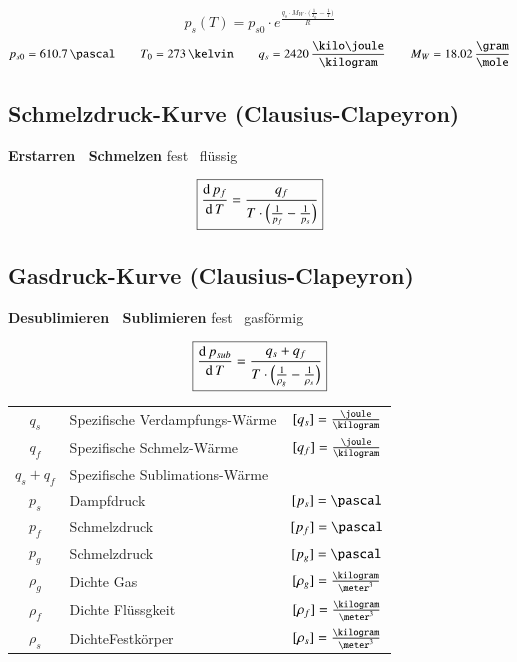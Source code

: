 \vspace{-0.2cm}

$$ \boxed{ p_s(T) = p_{s0} \cdot e^{\frac{q_s \cdot M_W \cdot \Big( \frac{1}{T_0} - \frac{1}{T} \Big)}{R}}} $$
$$ p_{s0} = 610.7 \, \pascal \qquad T_0 = 273 \, \kelvin \qquad q_s = 2420 \, \frac{\kilo \joule}{\kilogram} \qquad M_W = 18.02 \, \frac{\gram}{\mole} $$



\subsection{Schmelzdruck-Kurve (Clausius-Clapeyron)}

\textbf{Erstarren \textlrarrow\ Schmelzen}  \qquad fest \textlrarrow\ flüssig

$$ \boxed{ \frac{\mathop{} \! \mathrm{d} \, p_f}{\mathop{} \! \mathrm{d} \, T} = \frac{q_f}{T \cdot \Big( \frac{1}{p_f} - \frac{1}{p_s} \Big) } } $$


\subsection{Gasdruck-Kurve (Clausius-Clapeyron)}

\textbf{Desublimieren \textlrarrow\ Sublimieren} \qquad fest \textleftarrow\ gasförmig

$$ \boxed{ \frac{\mathop{} \! \mathrm{d} \, p_{sub}}{\mathop{} \! \mathrm{d} \, T} = \frac{q_s + q_f}{T \cdot \Big( \frac{1}{\rho_g} - \frac{1}{\rho_s} \Big) } } $$


\renewcommand{\arraystretch}{1.3}
\begin{tabular}{c l c}	
	$q_s$ 		& Spezifische Verdampfungs-Wärme 	& $[q_s] = \frac{\joule}{\kilogram}$		\\
	$q_f$ 		& Spezifische Schmelz-Wärme 		& $[q_f] = \frac{\joule}{\kilogram}$ 		\\
	$q_s + q_f$ & Spezifische Sublimations-Wärme 	&	 										\\
	$p_s$ 		& Dampfdruck 						& $[p_s] = \pascal$ 						\\
	$p_f$ 		& Schmelzdruck 						& $[p_f] = \pascal$ 						\\
	$p_g$ 		& Schmelzdruck 						& $[p_g] = \pascal$ 						\\
	$\rho_g$ 	& Dichte Gas 						& $[\rho_g] = \frac{\kilogram}{\meter^3}$	\\
	$\rho_f$ 	& Dichte Flüssgkeit 				& $[\rho_f] = \frac{\kilogram}{\meter^3}$	\\
	$\rho_s$ 	& DichteFestkörper 					& $[\rho_s] = \frac{\kilogram}{\meter^3}$	
\end{tabular}
\renewcommand{\arraystretch}{1}

\columnbreak